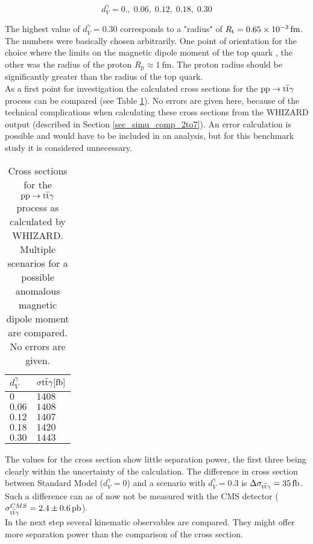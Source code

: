 \begin{equation}
d_V^{\gamma} = 0.,\; 0.06,\; 0.12,\; 0.18,\; 0.30
\label{eq_ano_val}
\end{equation}

The highest value of $d_V^{\gamma} = 0.30$ corresponds to a "radius" of $R_{\mathrm{t}} = \SI{0.65d-3}{\femto \meter}$. The numbers were basically chosen arbitrarily. One point of orientation for the choice where the limits on the magnetic dipole moment of the top quark \cite{Englert:2012by}, the other was the radius of the proton $R_{\mathrm{p}} \approx \SI{1}{\femto \meter}$. The proton radius should be significantly greater than the radius of the top quark. \\
As a first point for investigation the calculated cross sections for the $\mathrm{pp} \to \mathrm{t}\overline{\mathrm{t}} \gamma $ process can be compared (see Table \ref{tab_ano_crosssec}). No errors are given here, because of the technical complications when calculating these cross sections from the WHIZARD output (described in Section \ref{sec_simu_comp_2to7}). An error calculation is possible and would have to be included in an analysis, but for this benchmark study it is considered unnecessary.

\begin{table}[ht]
\centering
    \caption{Cross sections for the $\mathrm{pp} \to \mathrm{t}\overline{\mathrm{t}} \gamma$ process as calculated by WHIZARD. Multiple scenarios for a possible anomalous magnetic dipole moment are compared. No errors are given.}
    \begin{tabular}{| l | l |}

    \hline
    $d_{V}^{\gamma}$ & $\sigma{\ttgamma} [\SI{}{\femto \barn}]$ \\
    \hline
    $0$ &  $1408$\\
    \hline
    $0.06$ & $1408 $ \\
    \hline
    $0.12$ & $1407 $ \\
    \hline
    $0.18$ & $1420 $ \\
    \hline
    $0.30$ &  $1443 $\\
    \hline
    \end{tabular}
     \label{tab_ano_crosssec}
\end{table}

The values for the cross section show little separation power, the first three being clearly within the uncertainty of the calculation. The difference in cross section between Standard Model ($d_V^{\gamma} = 0$)  and a scenario with $d_V^{\gamma} = 0.3$ is $\Delta \sigma_{\ttgamma} = \SI{35}{\femto \barn}$. Such a difference can as of now not be measured with the CMS detector  ($\sigma^{CMS}_{\ttgamma} = \SI{2.4 \pm 0.6}{\pico \barn}$\cite{CMS-PAS-TOP-13-011}).\\
In the next step several kinematic observables are compared. They might offer more separation power than the comparison of the cross section.

